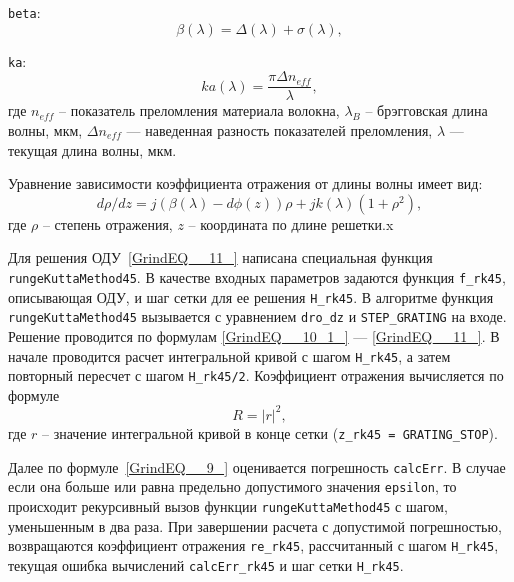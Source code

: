 \noindent \texttt{beta}:
\begin{equation} \label{GrindEQ__10_3_}
\beta \left(\lambda \right)=\Delta \left(\lambda \right)+\sigma \left(\lambda \right),
\end{equation}

\noindent \texttt{ka}:
\begin{equation} \label{GrindEQ__10_4_}
ka\left(\lambda \right)=\frac{\pi \Delta n_{eff}}{\lambda },
\end{equation}
где $n_{eff}$ -- показатель преломления материала волокна, $\lambda_B$ -- брэгговская длина волны, мкм, $\Delta n_{eff}$ --- наведенная разность показателей преломления, $\lambda$ --- текущая длина волны, мкм.

Уравнение зависимости коэффициента отражения от длины волны имеет вид:
\begin{equation} \label{GrindEQ__11_}
d\rho/dz=j(\beta(\lambda)-d\phi(z))\rho+jk(\lambda)(1+\rho^2),
\end{equation}
где $\rho$ -- степень отражения, $z$ -- координата по длине решетки.x

Для решения ОДУ~\eqref{GrindEQ__11_} написана специальная функция \texttt{rungeKuttaMethod45}. В качестве входных параметров задаются функция \texttt{f\_rk45}, описывающая ОДУ, и шаг сетки для ее решения \texttt{H\_rk45}. В алгоритме функция \texttt{rungeKuttaMethod45} вызывается с уравнением \texttt{dro\_dz} и \texttt{STEP\_GRATING} на входе. Решение проводится по формулам \eqref{GrindEQ__10_1_} --- \eqref{GrindEQ__11_}. В начале проводится расчет интегральной кривой с шагом \texttt{H\_rk45}, а затем повторный пересчет с шагом \texttt{H\_rk45/2}. Коэффициент отражения вычисляется по формуле
\begin{equation} \label{GrindEQ__12_}
R={\left|r\right|}^2,
\end{equation}
где $r$ -- значение интегральной кривой в конце сетки (\texttt{z\_rk45 = GRATING\_STOP}).

Далее по формуле~\eqref{GrindEQ__9_} оценивается погрешность \texttt{calcErr}. В случае если она больше или равна предельно допустимого значения \texttt{epsilon}, то происходит рекурсивный вызов функции \texttt{rungeKuttaMethod45} с шагом, уменьшенным в два раза. При завершении расчета с допустимой погрешностью, возвращаются коэффициент отражения \texttt{re\_rk45}, рассчитанный с шагом \texttt{H\_rk45}, текущая ошибка вычислений \texttt{calcErr\_rk45} и шаг сетки \texttt{H\_rk45}.

